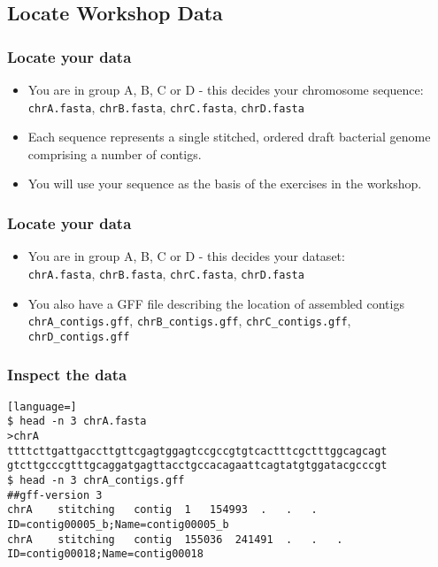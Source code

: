%

\subsection{Locate Workshop Data}
\begin{frame}
  \frametitle{Locate your data}
  \begin{itemize}
    \item You are in group A, B, C or D - this decides your chromosome sequence: \\
    \texttt{chrA.fasta}, \texttt{chrB.fasta}, \texttt{chrC.fasta}, \texttt{chrD.fasta}
    \item Each sequence represents a single stitched, ordered draft bacterial genome comprising a number of contigs.
    \item You will use your sequence as the basis of the exercises in the workshop.
  \end{itemize}
\end{frame}
  
\begin{frame}
  \frametitle{Locate your data}
  \begin{itemize}
    \item You are in group A, B, C or D - this decides your dataset: \\
    \texttt{chrA.fasta}, \texttt{chrB.fasta}, \texttt{chrC.fasta}, \texttt{chrD.fasta}
    \item You also have a GFF file describing the location of assembled contigs \\
    \texttt{chrA\_contigs.gff}, \texttt{chrB\_contigs.gff}, \texttt{chrC\_contigs.gff}, \texttt{chrD\_contigs.gff}
  \end{itemize}
\end{frame}
  
\begin{frame}[fragile]
  \frametitle{Inspect the data}
\begin{lstlisting}[language=]
$ head -n 3 chrA.fasta 
>chrA
ttttcttgattgaccttgttcgagtggagtccgccgtgtcactttcgctttggcagcagt
gtcttgcccgtttgcaggatgagttacctgccacagaattcagtatgtggatacgcccgt
$ head -n 3 chrA_contigs.gff 
##gff-version 3
chrA	stitching	contig	1	154993	.	.	.	ID=contig00005_b;Name=contig00005_b
chrA	stitching	contig	155036	241491	.	.	.	ID=contig00018;Name=contig00018
\end{lstlisting}
\end{frame}